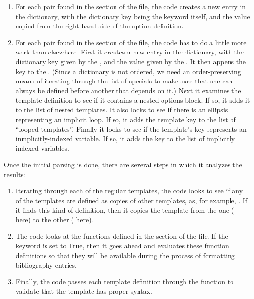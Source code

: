 \documentclass[letterpaper,10pt,english]{sphinxmanual}
\begin{document}
\begin{enumerate}
\item {} 
For each  pair found in the  section of the file, the code creates a new entry in the  dictionary, with the dictionary key being the keyword itself, and the value copied from the right hand side of the option definition.

\item {} 
For each  pair found in the  section of the file, the code has to do a little more work than elsewhere. First it creates a new entry in the  dictionary, with the dictionary key given by the , and the value given by the . It then appens the key to the . (Since a dictionary is not ordered, we need an order-preserving means of iterating through the list of specials to make sure that one can always be defined before another that depends on it.) Next it examines the template definition to see if it contains a nested options block. If so, it adds it to the list of nested templates. It also looks to see if there is an ellipsis representing an implicit loop. If so, it adds the template key to the list of ``looped templates''. Finally it looks to see if the template's key represents an inmplicitly-indexed variable. If so, it adds the key to the list of implicitly indexed variables.

\end{enumerate}

Once the initial parsing is done, there are several steps in which it analyzes the results:
\begin{enumerate}
\item {} 
Iterating through each of the regular templates, the code looks to see if any of the templates are defined as copies of other templates, as, for example, . If it finds this kind of definition, then it copies the template from the one ( here) to the other ( here).

\item {} 
The code looks at the functions defined in the  section of the file. If the  keyword is set to True, then it goes ahead and evaluates these function definitions so that they will be available during the process of formatting bibliography entries.

\item {} 
Finally, the code passes each template definition through the  function to validate that the template has proper syntax.

\end{enumerate}
\end{document}
